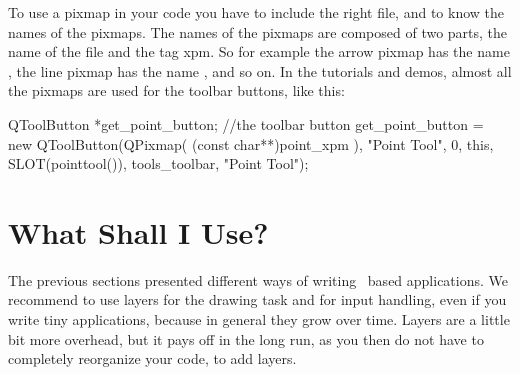 











To use a pixmap in your code you have to include the right file, and
to know the names of the pixmaps. The names of the pixmaps are
composed of two parts, the name of the file and the tag xpm. So for
example the arrow pixmap has the name , the line
pixmap has the name , and so on. In the
tutorials and demos, almost all the pixmaps are used for the toolbar
buttons, like this:

\ccExample
\begin{ccExampleCode}
    QToolButton *get_point_button; //the toolbar button
    get_point_button =  new QToolButton(QPixmap( (const char**)point_xpm ),
                                     "Point Tool", 
                                     0, 
                                     this, 
                                     SLOT(pointtool()), 
                                     tools_toolbar, 
                                     "Point Tool");
\end{ccExampleCode}



\section{What Shall I Use?}

The previous sections presented different ways of writing \qt\ based 
applications. We recommend to use layers for the drawing task and for
input handling, even if you write tiny applications, because in general
they grow over time. Layers are a little bit more overhead, but 
it pays off in the long run, as you then do not have to completely
reorganize your code, to add layers. 



